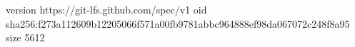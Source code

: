 version https://git-lfs.github.com/spec/v1
oid sha256:f273a112609b12205066f571a00fb9781abbc964888ef98da067072c248f8a95
size 5612

